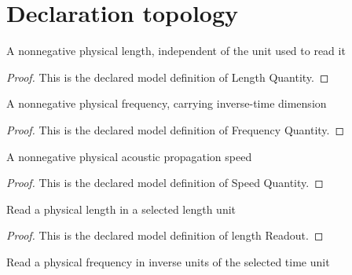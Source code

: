 \section{Declaration topology}
\begin{definition}
  \label{def:physics:phyx-mini-0184:phyxminiproblems-problemphyxmini0184-lengthquantity}
  A nonnegative physical length, independent of the unit used to read it
\end{definition}
\begin{proof}
  This is the declared model definition of Length Quantity.
\end{proof}
\begin{definition}
  \label{def:physics:phyx-mini-0184:phyxminiproblems-problemphyxmini0184-frequencyquantity}
  A nonnegative physical frequency, carrying inverse-time dimension
\end{definition}
\begin{proof}
  This is the declared model definition of Frequency Quantity.
\end{proof}
\begin{definition}
  \label{def:physics:phyx-mini-0184:phyxminiproblems-problemphyxmini0184-speedquantity}
  A nonnegative physical acoustic propagation speed
\end{definition}
\begin{proof}
  This is the declared model definition of Speed Quantity.
\end{proof}
\begin{definition}
  \label{def:physics:phyx-mini-0184:phyxminiproblems-problemphyxmini0184-lengthreadout}
  Read a physical length in a selected length unit
\end{definition}
\begin{proof}
  This is the declared model definition of length Readout.
\end{proof}
\begin{definition}
  \label{def:physics:phyx-mini-0184:phyxminiproblems-problemphyxmini0184-frequencyreadout}
  Read a physical frequency in inverse units of the selected time unit
\end{definition}
